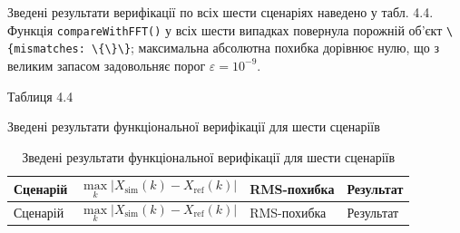 \documentclass[
]{article}
\newcommand{\passthrough}[1]{#1}
\begin{document}
Зведені результати верифікації по всіх шести сценаріях наведено у табл.
4.4. Функція
\passthrough{\lstinline!compareWithFFT!}\passthrough{\lstinline!()!} у
всіх шести випадках повернула порожній об'єкт
\passthrough{\lstinline!\{!}\passthrough{\lstinline!mismatches!}\passthrough{\lstinline!:!}\passthrough{\lstinline! !}\passthrough{\lstinline!\{\}\}!};
максимальна абсолютна похибка дорівнює нулю, що з великим запасом
задовольняє порог \(\varepsilon = 10^{- 9}\).

Таблиця 4.4

Зведені результати функціональної верифікації для шести сценаріїв

\begin{longtable}[]{@{}
  >{\raggedright\arraybackslash}p{}
  >{\raggedright\arraybackslash}p{}
  >{\raggedright\arraybackslash}p{}
  >{\raggedright\arraybackslash}p{}@{}}
\caption[Зведені результати функціональної верифікації для шести
сценаріїв]{Зведені результати функціональної верифікації для шести
сценаріїв}\tabularnewline
\toprule\noalign{}
\begin{minipage}[b]{\linewidth}\raggedright
Сценарій
\end{minipage} & \begin{minipage}[b]{\linewidth}\raggedright
\[\max_{k}|X_{\text{sim}}(k) - X_{\text{ref}}(k)|\]
\end{minipage} & \begin{minipage}[b]{\linewidth}\raggedright
RMS-похибка
\end{minipage} & \begin{minipage}[b]{\linewidth}\raggedright
Результат
\end{minipage} \\
\midrule\noalign{}
\endfirsthead
\toprule\noalign{}
\begin{minipage}[b]{\linewidth}\raggedright
Сценарій
\end{minipage} & \begin{minipage}[b]{\linewidth}\raggedright
\[\max_{k}|X_{\text{sim}}(k) - X_{\text{ref}}(k)|\]
\end{minipage} & \begin{minipage}[b]{\linewidth}\raggedright
RMS-похибка
\end{minipage} & \begin{minipage}[b]{\linewidth}\raggedright
Результат
\end{minipage} \\

\end{longtable}
\end{document}
